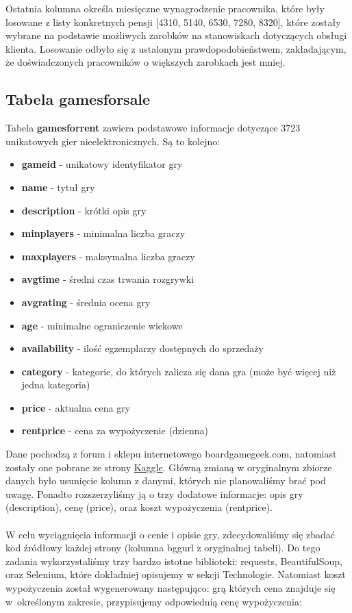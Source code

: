 \documentclass{article}
\begin{document}
		\noindent Ostatnia kolumna określa miesięczne wynagrodzenie pracownika, które były losowane z listy konkretnych pensji [4310, 5140, 6530, 7280, 8320], które zostały wybrane na podstawie możliwych zarobków na stanowiskach dotyczących obsługi klienta. Losowanie odbyło się z ustalonym prawdopodobieństwem, zakładającym, że doświadczonych pracowników o większych zarobkach jest mniej.
		
	\subsection{Tabela games\textunderscore for\textunderscore sale}
	Tabela \textbf{games\textunderscore for\textunderscore rent} zawiera podstawowe informacje dotyczące 3723 unikatowych gier nieelektronicznych. Są to kolejno:
	\begin{itemize}
		\setlength{\itemsep}{-2pt}
		\item \textbf{game\textunderscore id} - unikatowy identyfikator gry
		\item \textbf{name} - tytuł gry
		\item \textbf{description} - krótki opis gry
		\item \textbf{min\textunderscore players} - minimalna liczba graczy
		\item \textbf{max\textunderscore players} - maksymalna liczba graczy
		\item \textbf{avg\textunderscore time} - średni czas trwania rozgrywki
		\item  \textbf{avg\textunderscore rating} - średnia ocena gry
		\item \textbf{age} - minimalne ograniczenie wiekowe
		\item \textbf{availability} - ilość egzemplarzy dostępnych do sprzedaży
		\item  \textbf{category} - kategorie, do których zalicza się dana gra (może być więcej niż jedna kategoria)
		\item \textbf{price} - aktualna cena gry
		\item \textbf{rent\textunderscore price} - cena za wypożyczenie (dzienna)
	\end{itemize}
	
	\noindent Dane pochodzą z forum i sklepu internetowego boardgamegeek.com, natomiast zostały one pobrane ze strony \href{https://www.kaggle.com/datasets/mrpantherson/board-game-data}{Kaggle}.
	Główną zmianą w oryginalnym zbiorze danych było usunięcie kolumn z danymi, których nie planowaliśmy brać pod uwagę. Ponadto rozszerzyliśmy ją o trzy dodatowe informacje: opis gry (description), cenę (price), oraz koszt wypożyczenia (rent\textunderscore price). \\ \\
	W celu wyciągnięcia informacji o cenie i opisie gry, zdecydowaliśmy się zbadać kod źródłowy każdej strony (kolumna bgg\textunderscore url z oryginalnej tabeli). Do tego zadania wykorzystaliśmy trzy bardzo istotne biblioteki: requests, BeautifulSoup, oraz Selenium, które dokładniej opisujemy w sekcji Technologie. Natomiast koszt wypożyczenia został wygenerowany następująco: grą których cena znajduje się w~określonym zakresie, przypisujemy odpowiednią cenę wypożyczenia:
	
\end{document}
